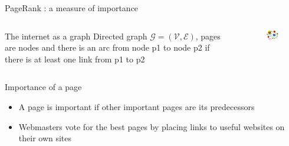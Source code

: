 \documentclass[10pt]{beamer}
\begin{document}
\begin{frame}{PageRank : a measure of importance}
\begin{columns}
    \begin{column}{5cm}
      \begin{block}{The internet as a graph}
        Directed graph $\mathcal{G}=(\mathcal{V},\mathcal{E})$, pages are nodes and there is an arc from node p1 to node p2 if there is at least one link from p1 to p2
      \end{block}
    \end{column}
    \begin{column}{5cm}
      \begin{figure}[r]
        \includegraphics[width =4.5cm]{PageRank-hi-res.png}
      \end{figure}
    \end{column}
  \end{columns}
\begin{block}{Importance of a page}
\begin{itemize}
\item A page is important if other important pages are its predecessors
\item Webmasters vote for the best pages by placing links to useful websites on their own sites
\end{itemize}
\end{block}
\end{frame}
\end{document}
